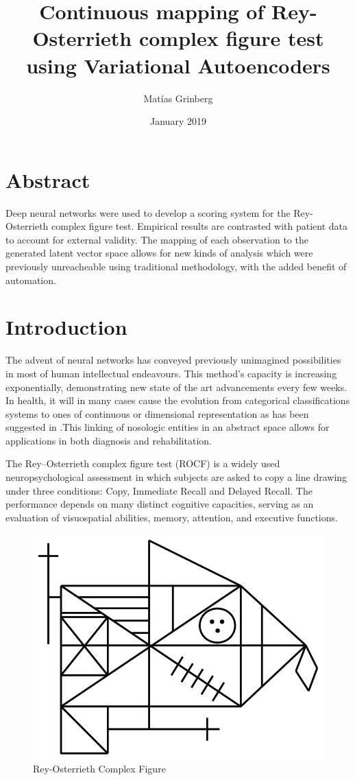 \documentclass[twocolumn]{article}
\title{Continuous mapping of Rey-Osterrieth complex figure test using Variational Autoencoders}
\author{Matías Grinberg}
\date{January 2019}
\begin{document}
\maketitle 
\section{Abstract}
Deep neural networks were used to develop a scoring system for the Rey-Osterrieth complex figure test. Empirical results are contrasted with  patient data to account for external validity. 
The mapping of each observation to the generated latent vector space allows for new kinds of analysis which were previously unreacheable using traditional methodology, with the added benefit of automation. 

\section{Introduction}
The advent of neural networks has conveyed previously unimagined possibilities in most of human intellectual endeavours.  This method's capacity is increasing exponentially, demonstrating new state of the art advancements every few weeks. In health, it will in many cases cause the evolution from categorical classifications systems to ones of continuous or dimensional representation as has been suggested in %
.This linking of nosologic entities in an abstract space allows for applications in both diagnosis and rehabilitation. 

The Rey–Osterrieth complex figure test (ROCF) is a widely used neuropsychological assessment in which subjects are asked to copy a line drawing under three conditions: Copy, Immediate Recall and Delayed Recall. The performance depends on many distinct cognitive capacities, serving as an evaluation of visuospatial abilities, memory, attention, and executive functions.

\begin{figure} [H]
    \centering
    \includegraphics[scale=0.15]{ROCF.png}
    \caption{Rey-Osterrieth Complex Figure}
    \label{fig:aes}
\end{figure}
\end{document}
